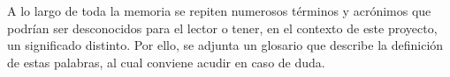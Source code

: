 A lo largo de toda la memoria se repiten numerosos términos y acrónimos que podrían
ser desconocidos para el lector o tener, en el contexto de este proyecto, un significado distinto. Por ello, se adjunta un glosario que describe la definición de estas palabras, al cual conviene acudir en caso de duda.






































